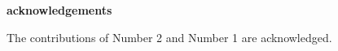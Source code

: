 \begin{center}
\textbf{\large acknowledgements}
\end{center}

The contributions of Number 2 and Number 1 are acknowledged.
